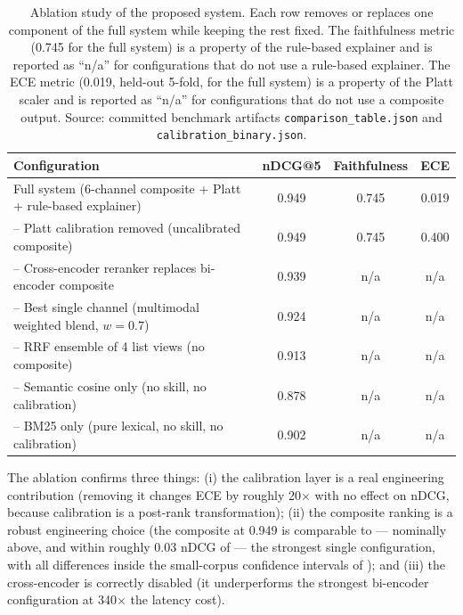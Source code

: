 \begin{table}[!t]
\centering
\caption{Ablation study of the proposed system. Each row removes or replaces one component of the full system while keeping the rest fixed. The faithfulness metric (0.745 for the full system) is a property of the rule-based explainer and is reported as ``n/a'' for configurations that do not use a rule-based explainer. The ECE metric (0.019, held-out 5-fold, for the full system) is a property of the Platt scaler and is reported as ``n/a'' for configurations that do not use a composite output. Source: committed benchmark artifacts \texttt{comparison\_table.json} and \texttt{calibration\_binary.json}.}
\label{tab:ablation}
\begin{tabular}{@{}lccc@{}}
\toprule
Configuration & nDCG@5 & Faithfulness & ECE \\
\midrule
Full system (6-channel composite + Platt + rule-based explainer) & 0.949 & 0.745 & 0.019 \\
\quad -- Platt calibration removed (uncalibrated composite) & 0.949 & 0.745 & 0.400 \\
\quad -- Cross-encoder reranker replaces bi-encoder composite & 0.939 & n/a & n/a \\
\quad -- Best single channel (multimodal weighted blend, $w=0.7$) & 0.924 & n/a & n/a \\
\quad -- RRF ensemble of 4 list views (no composite) & 0.913 & n/a & n/a \\
\quad -- Semantic cosine only (no skill, no calibration) & 0.878 & n/a & n/a \\
\quad -- BM25 only (pure lexical, no skill, no calibration) & 0.902 & n/a & n/a \\
\bottomrule
\end{tabular}
\end{table}

The ablation confirms three things: (i) the calibration layer is a real engineering contribution (removing it changes ECE by roughly 20$\times$ with no effect on nDCG, because calibration is a post-rank transformation); (ii) the composite ranking is a robust engineering choice (the composite at 0.949 is comparable to --- nominally above, and within roughly 0.03 nDCG of --- the strongest single configuration, with all differences inside the small-corpus confidence intervals of ); and (iii) the cross-encoder is correctly disabled (it underperforms the strongest bi-encoder configuration at 340$\times$ the latency cost).

